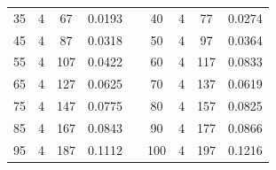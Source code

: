 \documentclass[a4paper, 12pt, french, oneside]{book}
\begin{document}
\begin{table}[!ht]
\begin{tabularx}{\linewidth}{|c|c|c|c|X|c|c|c|c|}
        35           & 4            & 67              & 0.0193                        &  &

        40           & 4            & 77              & 0.0274                                                                                                           \\

        45           & 4            & 87              & 0.0318                        &  &

        50           & 4            & 97              & 0.0364                                                                                                           \\

        55           & 4            & 107             & 0.0422                        &  &

        60           & 4            & 117             & 0.0833                                                                                                           \\

        65           & 4            & 127             & 0.0625                        &  &

        70           & 4            & 137             & 0.0619                                                                                                           \\

        75           & 4            & 147             & 0.0775                        &  &

        80           & 4            & 157             & 0.0825                                                                                                           \\

        85           & 4            & 167             & 0.0843                        &  &

        90           & 4            & 177             & 0.0866                                                                                                           \\

        95           & 4            & 187             & 0.1112                        &  &

        100          & 4            & 197             & 0.1216                                                                                                           \\


\end{tabularx}
\end{table}
\end{document}
